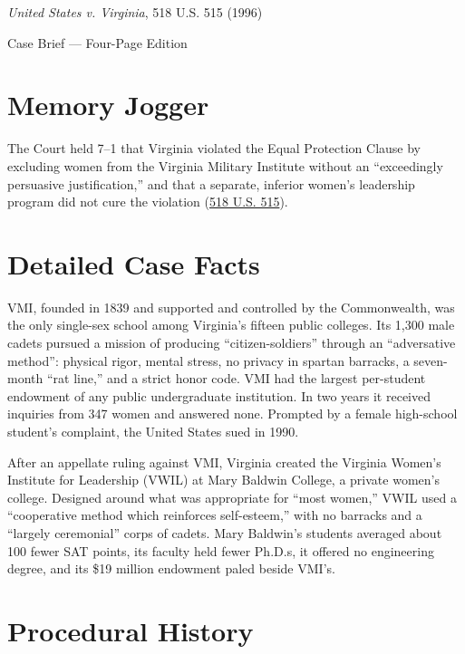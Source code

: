 \documentclass[12pt]{article}
\begin{document}
\begin{center}
{\LARGE \textit{United States v. Virginia}, 518 U.S. 515 (1996)\par}
\vspace{0.8em}
{\large Case Brief --- Four-Page Edition\par}
\end{center}
\vspace{1em}

\section{Memory Jogger}

The Court held 7--1 that Virginia violated the Equal Protection Clause by excluding women from the Virginia Military Institute without an ``exceedingly persuasive justification,'' and that a separate, inferior women's leadership program did not cure the violation (\href{https://supreme.justia.com/cases/federal/us/518/515/}{518 U.S. 515}).

\section{Detailed Case Facts}

VMI, founded in 1839 and supported and controlled by the Commonwealth, was the only single-sex school among Virginia's fifteen public colleges. Its 1,300 male cadets pursued a mission of producing ``citizen-soldiers'' through an ``adversative method'': physical rigor, mental stress, no privacy in spartan barracks, a seven-month ``rat line,'' and a strict honor code. VMI had the largest per-student endowment of any public undergraduate institution. In two years it received inquiries from 347 women and answered none. Prompted by a female high-school student's complaint, the United States sued in 1990.

After an appellate ruling against VMI, Virginia created the Virginia Women's Institute for Leadership (VWIL) at Mary Baldwin College, a private women's college. Designed around what was appropriate for ``most women,'' VWIL used a ``cooperative method which reinforces self-esteem,'' with no barracks and a ``largely ceremonial'' corps of cadets. Mary Baldwin's students averaged about 100 fewer SAT points, its faculty held fewer Ph.D.s, it offered no engineering degree, and its \$19 million endowment paled beside VMI's.

\section{Procedural History}
\end{document}
